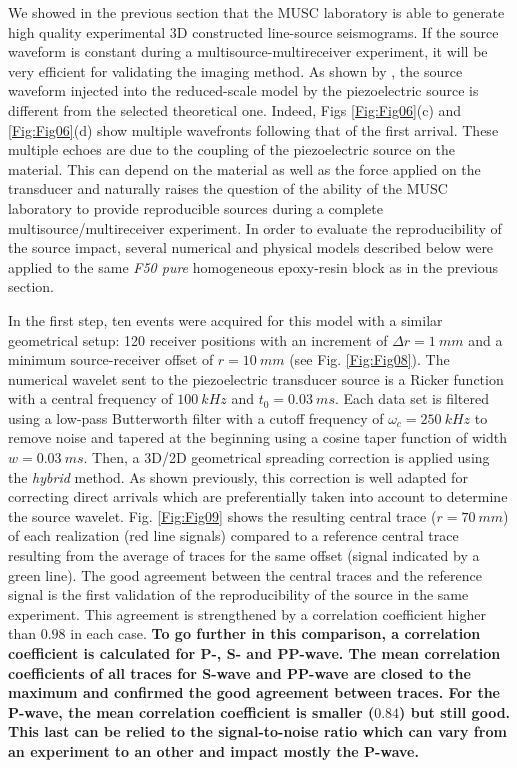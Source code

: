 \documentclass[extra,mreferee]{gji}
\newenvironment{orangenote}{\par\color{Orange}}{\par}
\begin{document}
\begin{orangenote}
We showed in the previous section that the MUSC laboratory is able to generate high quality experimental 3D constructed line-source seismograms. If the source waveform is constant during a multisource-multireceiver experiment, it will be very efficient for validating the imaging method. As shown by \cite{bretaudeau2011ssm}, the source waveform injected into the reduced-scale model by the piezoelectric source is different from the selected theoretical one. Indeed, Figs \ref{Fig:Fig06}(c) and \ref{Fig:Fig06}(d) show multiple wavefronts following that of the first arrival. These multiple echoes are due to the coupling of the piezoelectric source on the material. This can depend on the material as well as the force applied on the transducer and naturally raises the question of the ability of the MUSC laboratory to provide reproducible sources during a complete multisource/multireceiver experiment. In order to evaluate the reproducibility of the source impact, several numerical and physical models described below were applied to the same \textit{F50 pure} homogeneous epoxy-resin block as in the previous section.

In the first step, ten events were acquired for this model with a similar geometrical setup: 120 receiver positions with an increment of $\Delta r= 1\ mm$ and a minimum source-receiver offset of $r=10\ mm$ (see Fig. \ref{Fig:Fig08}). The numerical wavelet sent to the piezoelectric transducer source is a Ricker function with a central frequency of $100\ kHz$ and $t_{0}=0.03\ ms$. Each data set is filtered using a low-pass Butterworth filter with a cutoff frequency of $\omega_{c}=250\ kHz$ to remove noise and tapered at the beginning using a cosine taper function of width $w=0.03\ ms$. Then, a 3D/2D geometrical spreading correction is applied using the \textit{hybrid} method. As shown previously, this correction is well adapted for correcting direct arrivals which are preferentially taken into account to determine the source wavelet. Fig. \ref{Fig:Fig09} shows the resulting central trace ($r=70\ mm$) of each realization (red line signals) compared to a reference central trace resulting from the average of traces for the same offset (signal indicated by a green line). The good agreement between the central traces and the reference signal is the first validation of the reproducibility of the source in the same experiment. This agreement is strengthened by a correlation coefficient higher than $0.98$ in each case. 
\textbf{To go further in this comparison, a correlation coefficient is calculated for P-, S- and PP-wave. The mean correlation coefficients of all traces for S-wave and PP-wave are closed to the maximum and confirmed the good agreement between traces. For the P-wave, the mean correlation coefficient is smaller ($0.84$) but still good. This last can be relied to the signal-to-noise ratio which can vary from an experiment to an other and impact mostly the P-wave.}


\end{orangenote}
\end{document}
